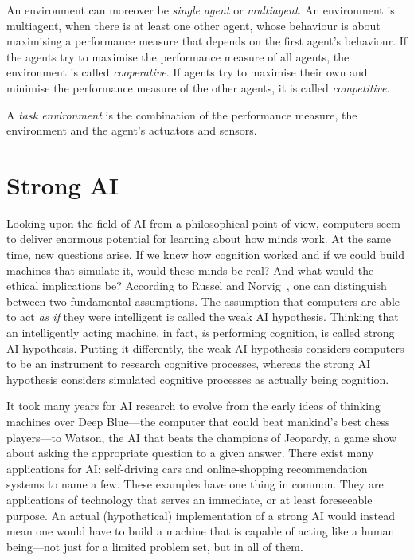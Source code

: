 An environment can moreover be \emph{single agent} or \emph{multiagent}. An environment is multiagent, when there is at least one other agent, whose behaviour is about maximising a performance measure that depends on the first agent's behaviour. If the agents try to maximise the performance measure of all agents, the environment is called \emph{cooperative}. If agents try to maximise their own and minimise the performance measure of the other agents, it is called \emph{competitive}.

A \emph{task environment} is the combination of the performance measure, the environment and the agent's actuators and sensors.

    \section{Strong AI}

Looking upon the field of AI from a philosophical point of view, computers seem to deliver enormous potential for learning about how minds work. At the same time, new questions arise. If we knew how cognition worked and if we could build machines that simulate it, would these minds be real? And what would the ethical implications be? According to Russel and Norvig~\cite{russell2009artificial}, one can distinguish between two fundamental assumptions. The assumption that computers are able to act \emph{as if} they were intelligent is called the weak AI hypothesis. Thinking that an intelligently acting machine, in fact, \emph{is} performing cognition, is called strong AI hypothesis. Putting it differently, the weak AI hypothesis considers computers to be an instrument to research cognitive processes, whereas the strong AI hypothesis considers simulated cognitive processes as actually being cognition.  

It took many years for AI research to evolve from the early ideas of thinking machines over Deep Blue---the computer that could beat mankind's best chess players---to Watson, the AI that beats the champions of Jeopardy, a game show about asking the appropriate question to a given answer. There exist many applications for AI: self-driving cars and online-shopping recommendation systems to name a few. These examples have one thing in common. They are applications of technology that serves an immediate, or at least foreseeable purpose. An actual (hypothetical) implementation of a strong AI would instead mean one would have to build a machine that is capable of acting like a human being---not just for a limited problem set, but in all of them. 

